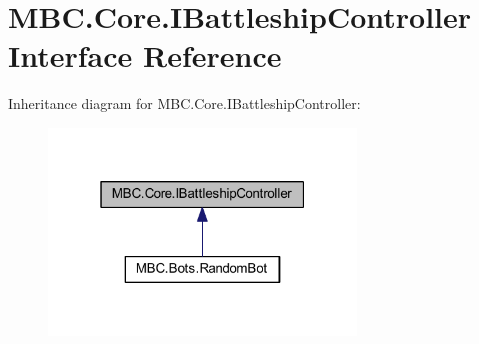 \hypertarget{interface_m_b_c_1_1_core_1_1_i_battleship_controller}{\section{M\-B\-C.\-Core.\-I\-Battleship\-Controller Interface Reference}
\label{interface_m_b_c_1_1_core_1_1_i_battleship_controller}
}


Inheritance diagram for M\-B\-C.\-Core.\-I\-Battleship\-Controller\-:\nopagebreak
\begin{figure}[H]
\begin{center}
\leavevmode
\includegraphics[width=232pt]{interface_m_b_c_1_1_core_1_1_i_battleship_controller__inherit__graph}
\end{center}
\end{figure}
